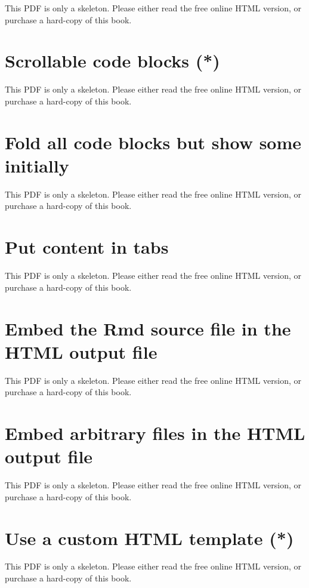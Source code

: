 \documentclass[
  11pt,
]{krantz}
\begin{document}
This PDF is only a skeleton. Please either read the free online HTML version, or purchase a hard-copy of this book.

\section{Scrollable code blocks (*)}\label{html-scroll}

This PDF is only a skeleton. Please either read the free online HTML version, or purchase a hard-copy of this book.

\section{Fold all code blocks but show some initially}\label{fold-show}

This PDF is only a skeleton. Please either read the free online HTML version, or purchase a hard-copy of this book.

\section{Put content in tabs}\label{html-tabs}

This PDF is only a skeleton. Please either read the free online HTML version, or purchase a hard-copy of this book.

\section{Embed the Rmd source file in the HTML output file}\label{embed-rmd}

This PDF is only a skeleton. Please either read the free online HTML version, or purchase a hard-copy of this book.

\section{Embed arbitrary files in the HTML output file}\label{embed-file}

This PDF is only a skeleton. Please either read the free online HTML version, or purchase a hard-copy of this book.

\section{Use a custom HTML template (*)}\label{html-template}

This PDF is only a skeleton. Please either read the free online HTML version, or purchase a hard-copy of this book.
\end{document}
